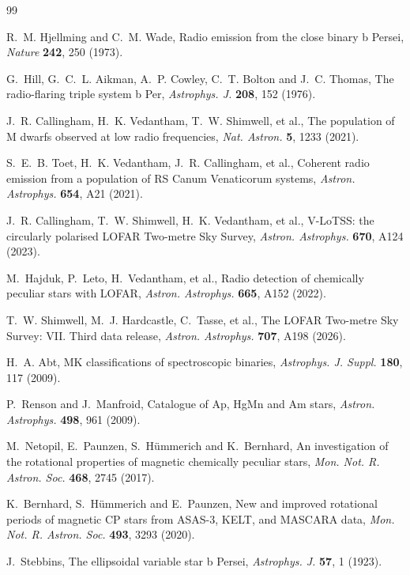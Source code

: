 \documentclass[3p,11pt]{elsarticle}
\begin{document}
\begin{thebibliography}{99}\small\raggedright
\setlength{\itemsep}{1pt}

R.~M. Hjellming and C.~M. Wade, Radio emission from the close binary b Persei,
\emph{Nature} \textbf{242}, 250 (1973).

G.~Hill, G.~C.~L. Aikman, A.~P. Cowley, C.~T. Bolton and J.~C. Thomas, The radio-flaring
triple system b Per, \emph{Astrophys. J.} \textbf{208}, 152 (1976).

J.~R. Callingham, H.~K. Vedantham, T.~W. Shimwell, et al., The population of M dwarfs
observed at low radio frequencies, \emph{Nat. Astron.} \textbf{5}, 1233 (2021).

S.~E.~B. Toet, H.~K. Vedantham, J.~R. Callingham, et al., Coherent radio emission from a
population of RS Canum Venaticorum systems, \emph{Astron. Astrophys.} \textbf{654}, A21
(2021).

J.~R. Callingham, T.~W. Shimwell, H.~K. Vedantham, et al., V-LoTSS: the circularly
polarised LOFAR Two-metre Sky Survey, \emph{Astron. Astrophys.} \textbf{670}, A124
(2023).

M.~Hajduk, P.~Leto, H.~Vedantham, et al., Radio detection of chemically peculiar stars
with LOFAR, \emph{Astron. Astrophys.} \textbf{665}, A152 (2022).

T.~W. Shimwell, M.~J. Hardcastle, C.~Tasse, et al., The LOFAR Two-metre Sky Survey: VII.
Third data release, \emph{Astron. Astrophys.} \textbf{707}, A198 (2026).

H.~A. Abt, MK classifications of spectroscopic binaries, \emph{Astrophys. J. Suppl.}
\textbf{180}, 117 (2009).

P.~Renson and J.~Manfroid, Catalogue of Ap, HgMn and Am stars, \emph{Astron. Astrophys.}
\textbf{498}, 961 (2009).

M.~Netopil, E.~Paunzen, S.~H\"ummerich and K.~Bernhard, An investigation of the rotational
properties of magnetic chemically peculiar stars, \emph{Mon. Not. R. Astron. Soc.}
\textbf{468}, 2745 (2017).

K.~Bernhard, S.~H\"ummerich and E.~Paunzen, New and improved rotational periods of
magnetic CP stars from ASAS-3, KELT, and MASCARA data, \emph{Mon. Not. R. Astron. Soc.}
\textbf{493}, 3293 (2020).

J.~Stebbins, The ellipsoidal variable star b Persei, \emph{Astrophys. J.} \textbf{57}, 1
(1923).


\end{thebibliography}
\end{document}

